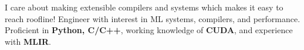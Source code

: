 \vspace{-1.0em}
\begin{cventries}
  \vspace{-1.0em}
  \cventry
    {}
    {}
    {}
    {}
    {		
		I care about making extensible compilers and systems which makes it easy to reach roofline! Engineer with interest in ML systems, compilers, and performance.
		Proficient in \textbf{Python, C/C++}, working knowledge of \textbf{CUDA}, and experience with \textbf{MLIR}. 
    }

\end{cventries}
